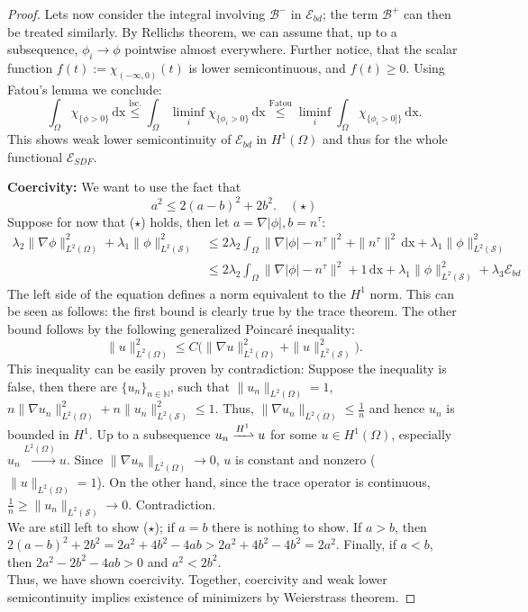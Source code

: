 \documentclass[12pt,openany]{book}
\def\S{\mathcal{S}}
\theoremstyle{plainnormal}
\theoremstyle{remark}
\begin{document}
\begin{proof}
Lets now consider the integral involving $\mathcal{B}^-$ in $\mathcal E_{bd}$; the term $\mathcal B^+$ can then be treated similarly. By Rellichs theorem, we can assume that, up to a subsequence, $\phi_i \rightarrow\phi$ pointwise almost everywhere. Further notice, that the scalar function $f(t) := \chi_{(-\infty, 0)}(t)$ is lower semicontinuous, and $f(t) \geq 0$. Using Fatou's lemma we conclude: $$\int_\Omega  \chi_{\{\phi > 0\}}  \,\mathrm{dx} \overset{\text{lsc.}}{\leq} \int_\Omega \liminf_i  \chi_{\{\phi_i > 0\}}  \,\mathrm{dx} \overset{\text{Fatou}}{\leq} \liminf_i\int_\Omega  \chi_{\{\phi_i > 0]\}}  \,\mathrm{dx}.$$ This shows weak lower semicontinuity of $\mathcal{E}_{bd}$ in $H^1(\Omega)$ and thus for the whole functional $\mathcal{E}_{SDF}.$\par
\textbf{Coercivity:} We want to use the fact that 
$$
    a^2 \leq 2(a-b)^2 + 2b^2. \quad {(\star)}
$$
Suppose for now that ($\star$) holds, then let $a = \nabla |\phi|, b = n^\tau$: 
\begin{align*}
    \lambda_2\|\nabla \phi\| ^2_{L^2(\Omega)} + \lambda_1 \|\phi\| ^2_{L^2(\S)} &\leq 2 \lambda_2\int_\Omega \| \nabla |\phi| - n^\tau\|^2 
 + \|n^\tau\|^2\,\mathrm{dx}+ \lambda_1 \|\phi\| ^2_{L^2(\S)}\\
 &\leq 2 \lambda_2\int_\Omega \| \nabla |\phi| - n^\tau\|^2 
 + 1 \,\mathrm{dx}+ \lambda_1 \|\phi\| ^2_{L^2(\S)} + \lambda_3 \mathcal{E}_{bd}
\end{align*} 
The left side of the equation defines a norm equivalent to the $H^1$ norm. This can be seen as follows: the first bound is clearly true by the trace theorem. The other bound follows by the following generalized Poincar\'e inequality: $$\|u\|^2_{L^2(\Omega)} \leq C\Big( \|\nabla u\|^2_{L^2(\Omega)} +  \|u\|^2_{L^2(\mathcal{\S})}\Big).$$
This inequality can be easily proven by contradiction: Suppose the inequality is false, then there are $\{u_n\}_{n\in\mathbb N}$, such that $\|u_n\|_{L^2(\Omega)} = 1$, $n\|\nabla u_n\|^2_{L^2(\Omega)} +  n\|u_n\|^2_{L^2(\mathcal{\S})} \leq 1$. Thus, $\|\nabla u_n\|_{L^2(\Omega)} \leq \frac{1}{n}$ and hence $u_n$ is bounded in $H^1$. Up to a subsequence $u_n \xrightharpoonup{H^1}u$ for some $u\in H^1(\Omega)$, especially $u_n \xrightarrow{L^2(\Omega)}u$. Since $\|\nabla u_n\|_{L^2(\Omega)} \rightarrow 0$, $u$ is constant and nonzero ($\|u\|_{L^2(\Omega)} = 1$). On the other hand, since the trace operator is continuous, $\frac{1}{n} \geq \|u_n\|_{L^2(\S)} \rightarrow 0 $. Contradiction.\\
We are still left to show ($\star$); if $a=b$ there is nothing to show. If $a> b$, then $2(a-b)^2  + 2b^2 = 2a^2 + 4b^2 - 4ab > 2a^2 +4b^2 - 4b^2 = 2a^2 $. Finally, if $a<b$, then $2a^2 - 2b^2 - 4ab > 0$ and $a^2 < 2b^2$.\\
Thus, we have shown coercivity.
Together, coercivity and weak lower semicontinuity implies existence of minimizers by Weierstrass theorem.
\end{proof}
\end{document}
